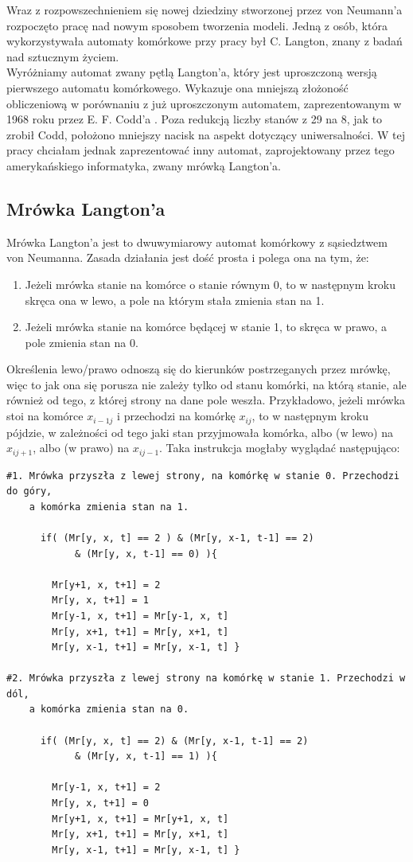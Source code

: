 \documentclass[a4paper,12pt]{article}
\begin{document}
Wraz z rozpowszechnieniem się nowej dziedziny stworzonej przez von Neumann'a rozpoczęto pracę nad nowym sposobem tworzenia modeli. Jedną z osób, która wykorzystywała automaty komórkowe przy pracy był C. Langton, znany z badań nad sztucznym życiem\cite{lan}.\\
Wyróżniamy automat zwany pętlą Langton'a, który jest uproszczoną wersją pierwszego automatu komórkowego. Wykazuje ona mniejszą złożoność obliczeniową w porównaniu z już uproszczonym automatem, zaprezentowanym w 1968 roku przez E. F. Codd'a \cite{loop}. Poza redukcją liczby stanów z 29 na 8, jak to zrobił Codd, położono mniejszy nacisk na aspekt dotyczący uniwersalności. W tej pracy chciałam jednak zaprezentować inny automat, zaprojektowany przez tego amerykańskiego informatyka, zwany mrówką Langton'a.

\subsection{Mrówka Langton'a}
Mrówka Langton'a jest to dwuwymiarowy automat komórkowy z sąsiedztwem von Neumanna. Zasada działania jest dość prosta i polega ona na tym, że:
\begin{enumerate}
    \item Jeżeli mrówka stanie na komórce o stanie równym 0, to w następnym kroku skręca ona w lewo, a pole na którym stała zmienia stan na 1.
    \item Jeżeli mrówka stanie na komórce będącej w stanie 1, to skręca w prawo, a pole zmienia stan na 0.
\end{enumerate}
  Określenia lewo/prawo odnoszą się do kierunków postrzeganych przez mrówkę, więc to jak ona się porusza nie zależy tylko od stanu komórki, na którą stanie, ale również od tego, z której strony na dane pole weszła. Przykładowo, jeżeli mrówka stoi na komórce $x_{i-1j}$ i przechodzi na komórkę $x_{ij}$, to w następnym kroku pójdzie, w zależności od tego jaki stan przyjmowała komórka,  albo (w lewo) na $x_{ij+1}$, albo (w prawo) na $x_{ij-1}$. Taka instrukcja mogłaby wyglądać następująco:
\begin{verbatim}
#1. Mrówka przyszła z lewej strony, na komórkę w stanie 0. Przechodzi do góry,
    a komórka zmienia stan na 1.
      
      if( (Mr[y, x, t] == 2 ) & (Mr[y, x-1, t-1] == 2) 
            & (Mr[y, x, t-1] == 0) ){
            
        Mr[y+1, x, t+1] = 2
        Mr[y, x, t+1] = 1 
        Mr[y-1, x, t+1] = Mr[y-1, x, t] 
        Mr[y, x+1, t+1] = Mr[y, x+1, t] 
        Mr[y, x-1, t+1] = Mr[y, x-1, t] }
        
#2. Mrówka przyszła z lewej strony na komórkę w stanie 1. Przechodzi w dól,
    a komórka zmienia stan na 0.
      
      if( (Mr[y, x, t] == 2) & (Mr[y, x-1, t-1] == 2) 
            & (Mr[y, x, t-1] == 1) ){
            
        Mr[y-1, x, t+1] = 2
        Mr[y, x, t+1] = 0
        Mr[y+1, x, t+1] = Mr[y+1, x, t] 
        Mr[y, x+1, t+1] = Mr[y, x+1, t] 
        Mr[y, x-1, t+1] = Mr[y, x-1, t] }
\end{verbatim}
\end{document}
